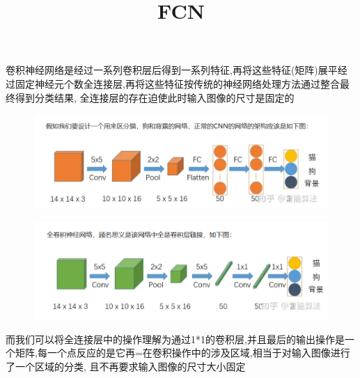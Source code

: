 \documentclass{article}
\begin{document}
\title{FCN}
卷积神经网络是经过一系列卷积层后得到一系列特征,再将这些特征(矩阵)展平经过固定神经元个数全连接层,再将这些特征按传统的神经网络处理方法通过整合最终得到分类结果,
全连接层的存在迫使此时输入图像的尺寸是固定的
\begin{figure}
    \includegraphics{CCN.png}
\end{figure}
\begin{figure}
    \includegraphics{FCN.png}
\end{figure}
而我们可以将全连接层中的操作理解为通过1*1的卷积层,并且最后的输出操作是一个矩阵,每一个点反应的是它再=在卷积操作中的涉及区域,相当于对输入图像进行了一个区域的分类,
且不再要求输入图像的尺寸大小固定
\end{document}
